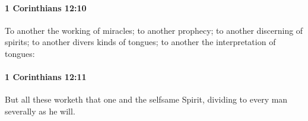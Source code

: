 		\paragraph{1 Corinthians 12:10} %
			\label{1CORINTHIANS-12-10}

			To another the working of miracles; to another prophecy; to another discerning of spirits; to another divers kinds of tongues; to another the interpretation of tongues:

			\begin{framed}
				\scriptsize
				\begin{compactdesc}
					\item[SBLG] 
				\end{compactdesc}
			\end{framed}

		\paragraph{1 Corinthians 12:11} %
			\label{1CORINTHIANS-12-11}

			But all these worketh that one and the selfsame Spirit, dividing to every man severally as he will.

